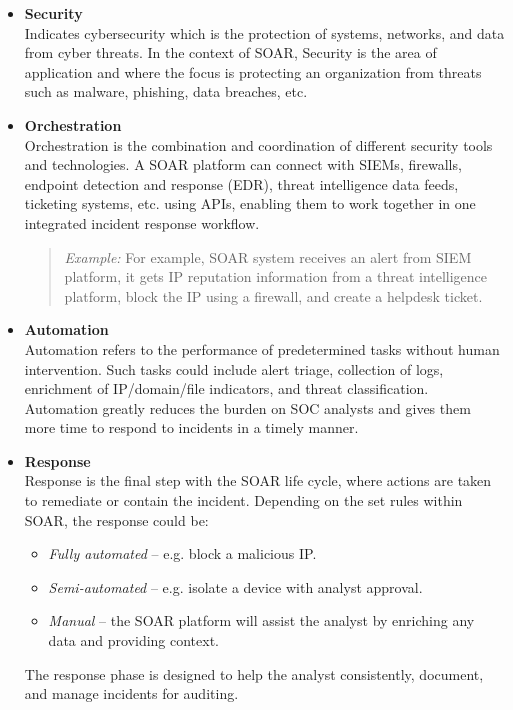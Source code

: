 \begin{itemize}
    \item \textbf{Security} \\
    Indicates cybersecurity which is the protection of systems, networks, and data from cyber threats. In the context of SOAR, Security is the area of application and where the focus is protecting an organization from threats such as malware, phishing, data breaches, etc.

    \item \textbf{Orchestration} \\
    Orchestration is the combination and coordination of different security tools and technologies. A SOAR platform can connect with SIEMs, firewalls, endpoint detection and response (EDR), threat intelligence data feeds, ticketing systems, etc. using APIs, enabling them to work together in one integrated incident response workflow.

    \begin{quote}
        \textit{Example:} For example, SOAR system receives an alert from SIEM platform, it gets IP reputation information from a threat intelligence platform, block the IP using a firewall, and create a helpdesk ticket.
    \end{quote}

    \item \textbf{Automation} \\
    Automation refers to the performance of predetermined tasks without human intervention. Such tasks could include alert triage, collection of logs, enrichment of IP/domain/file indicators, and threat classification. Automation greatly reduces the burden on SOC analysts and gives them more time to respond to incidents in a timely manner.

    \item \textbf{Response} \\
    Response is the final step with the SOAR life cycle, where actions are taken to remediate or contain the incident. Depending on the set rules within SOAR, the response could be:
    \begin{itemize}[noitemsep, topsep=0pt]
        \item \textit{Fully automated} – e.g. block a malicious IP.
        \item \textit{Semi-automated} – e.g. isolate a device with analyst approval.
        \item \textit{Manual} – the SOAR platform will assist the analyst by enriching any data and providing context.
    \end{itemize}
    The response phase is designed to help the analyst consistently, document, and manage incidents for auditing.
\end{itemize}

